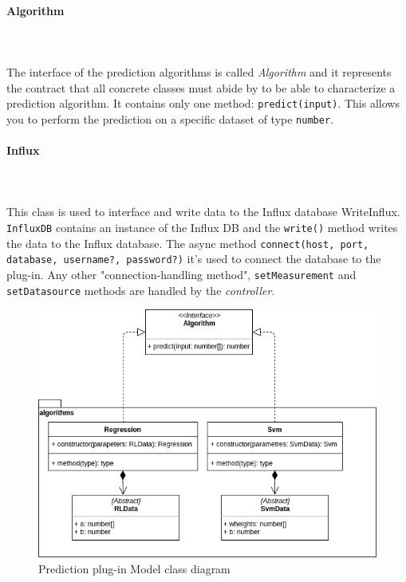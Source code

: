 \paragraph*{Algorithm}\mbox{} \\ \mbox{} \\
The interface of the prediction algorithms is called \textit{Algorithm} and it
represents the contract that all concrete classes must abide by
to be able to characterize a prediction algorithm. It contains only one method:
\texttt{predict(input)}. This allows you to perform the prediction on a specific dataset of type \texttt{number}.

\paragraph*{Influx}\mbox{} \\ \mbox{} \\
This class is used to interface and write data to the Influx database WriteInflux. \texttt{InfluxDB} contains an instance of the Influx DB and the \texttt{write()} method writes the data to the Influx database. The async method \texttt{connect(host, port, database, username?, password?)} it's used to connect the database to the plug-in. Any other "connection-handling method", \texttt{setMeasurement} and \texttt{setDatasource} methods are handled by the \textit{controller}.

\begin{figure}[H]
\centering
\includegraphics[scale=0.45]{../../../Diagrams/Classes_diagrams/plugin_model.png}
\caption{Prediction plug-in Model class diagram}
\end{figure}

